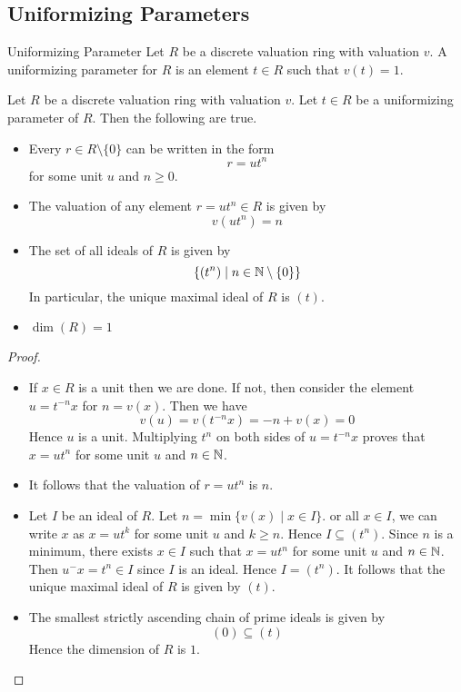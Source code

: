 \documentclass[a4paper]{article}
\begin{document}
\subsection{Uniformizing Parameters}
\begin{defn}{Uniformizing Parameter}{} Let $R$ be a discrete valuation ring with valuation $v$. A uniformizing parameter for $R$ is an element $t\in R$ such that $v(t)=1$. 
\end{defn}

\begin{prp}{}{} Let $R$ be a discrete valuation ring with valuation $v$. Let $t\in R$ be a uniformizing parameter of $R$. Then the following are true. 
\begin{itemize}
\item Every $r\in R\setminus\{0\}$ can be written in the form $$r=ut^n$$ for some unit $u$ and $n\geq 0$. 
\item The valuation of any element $r=ut^n\in R$ is given by $$v(ut^n)=n$$
\item The set of all ideals of $R$ is given by $$\{(t^n)\;|\;n\in\mathbb{N}\setminus\{0\}\}$$ In particular, the unique maximal ideal of $R$ is $(t)$. 
\item $\dim(R)=1$
\end{itemize} \tcbline
\begin{proof}~\\
\begin{itemize}
\item If $x\in R$ is a unit then we are done. If not, then consider the element $u=t^{-n}x$ for $n=v(x)$. Then we have $$v(u)=v(t^{-n}x)=-n+v(x)=0$$ Hence $u$ is a unit. Multiplying $t^n$ on both sides of $u=t^{-n}x$ proves that $x=ut^n$ for some unit $u$ and $n\in\mathbb{N}$. 
\item It follows that the valuation of $r=ut^n$ is $n$. 
\item Let $I$ be an ideal of $R$. Let $n=\min\{v(x)\;|\;x\in I\}$. or all $x\in I$, we can write $x$ as $x=ut^k$ for some unit $u$ and $k\geq n$. Hence $I\subseteq(t^n)$. Since $n$ is a minimum, there exists $x\in I$ such that $x=ut^n$ for some unit $u$ and $n\in\mathbb{N}$. Then $u^{-}x=t^n\in I$ since $I$ is an ideal. Hence $I=(t^n)$. It follows that the unique maximal ideal of $R$ is given by $(t)$. 
\item The smallest strictly ascending chain of prime ideals is given by $$(0)\subseteq (t)$$ Hence the dimension of $R$ is $1$. 
\end{itemize}
\end{proof}
\end{prp}
\end{document}
